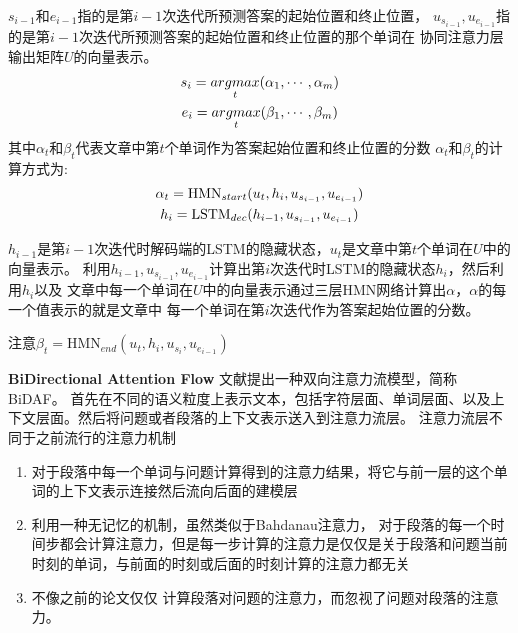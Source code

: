 $s_{i-1}$和$e_{i-1}$指的是第$i-1$次迭代所预测答案的起始位置和终止位置，
$u_{s_{i-1}},u_{e_{i-1}}$指的是第$i-1$次迭代所预测答案的起始位置和终止位置的那个单词在
协同注意力层输出矩阵$U$的向量表示。
\begin{gather}
s_i=\underset{t}{argmax}(\alpha_1,\cdots,\alpha_m)\notag \\
e_i=\underset{t}{argmax}(\beta_1,\cdots,\beta_m) \notag
\end{gather}
其中$\alpha_t$和$\beta_t$代表文章中第$t$个单词作为答案起始位置和终止位置的分数
$\alpha_t$和$\beta_t$的计算方式为:
\begin{gather}
    \alpha_t=\text{HMN}_{start}(u_t,h_i,u_{s_{i-1}},u_{e_{i-1}}) \notag \\
    h_i=\text{LSTM}_{dec}(h_{i-1},u_{s_{i-1}},u_{e_{i-1}}) \notag 
\end{gather}

$h_{i-1}$是第$i-1$次迭代时解码端的LSTM的隐藏状态，$u_t$是文章中第$t$个单词在$U$中的向量表示。
利用$h_{i-1},u_{s_{i-1}},u_{e_{i-1}}$计算出第$i$次迭代时LSTM的隐藏状态$h_i$，然后利用$h_i$以及
文章中每一个单词在$U$中的向量表示通过三层HMN网络计算出$\alpha$，$\alpha$的每一个值表示的就是文章中
每一个单词在第$i$次迭代作为答案起始位置的分数。

注意$\beta_t=\text{HMN}_{end}(u_t,h_i,u_{s_i},u_{e_{i-1}})$





\textbf{\kaishu {} BiDirectional Attention Flow}
文献提出一种双向注意力流模型，简称BiDAF。
首先在不同的语义粒度上表示文本，包括字符层面、单词层面、以及上下文层面。然后将问题或者段落的上下文表示送入到注意力流层。
注意力流层不同于之前流行的注意力机制
\begin{enumerate}
    \item 对于段落中每一个单词与问题计算得到的注意力结果，将它与前一层的这个单词的上下文表示连接然后流向后面的建模层
    \item 利用一种无记忆的机制，虽然类似于Bahdanau注意力，
对于段落的每一个时间步都会计算注意力，但是每一步计算的注意力是仅仅是关于段落和问题当前时刻的单词，与前面的时刻或后面的时刻计算的注意力都无关
    \item 不像之前的论文仅仅
计算段落对问题的注意力，而忽视了问题对段落的注意力。
\end{enumerate}

